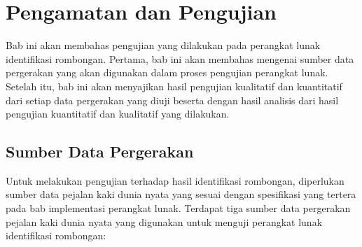 \chapter{Pengamatan dan Pengujian}
\label{chap:pengujian}

Bab ini akan membahas pengujian yang dilakukan pada perangkat lunak identifikasi rombongan. Pertama, bab ini akan membahas mengenai sumber data pergerakan yang akan digunakan dalam proses pengujian perangkat lunak. Setelah itu, bab ini akan menyajikan hasil pengujian kualitatif dan kuantitatif dari setiap data pergerakan yang diuji beserta dengan hasil analisis dari hasil pengujian kuantitatif dan kualitatif yang dilakukan.

\section{Sumber Data Pergerakan}
\label{bab6:data-pergerakan}

Untuk melakukan pengujian terhadap hasil identifikasi rombongan, diperlukan sumber data pejalan kaki dunia nyata yang sesuai dengan spesifikasi yang tertera pada bab implementasi perangkat lunak. Terdapat tiga sumber data pergerakan pejalan kaki dunia nyata yang digunakan untuk menguji perangkat lunak identifikasi rombongan:

